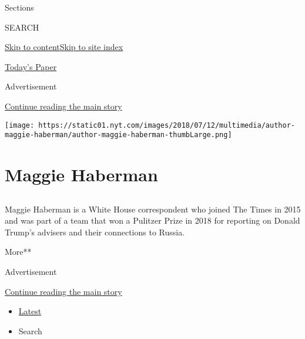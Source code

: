 Sections

SEARCH

\protect\hyperlink{site-content}{Skip to
content}\protect\hyperlink{site-index}{Skip to site index}

\href{https://myaccount.nytimes.com/auth/login?response_type=cookie\&client_id=vi}{}

\href{https://www.nytimes.com/section/todayspaper}{Today's Paper}

Advertisement

\protect\hyperlink{after-top}{Continue reading the main story}

\texttt{[image: https://static01.nyt.com/images/2018/07/12/multimedia/author-maggie-haberman/author-maggie-haberman-thumbLarge.png]}

\hypertarget{maggie-haberman}{%
\section{Maggie Haberman}\label{maggie-haberman}}

\subsection{}

Maggie Haberman is a White House correspondent who joined The Times in
2015 and was part of a team that won a Pulitzer Prize in 2018 for
reporting on Donald Trump's advisers and their connections to Russia.

More**

Advertisement

\protect\hyperlink{after-mid1}{Continue reading the main story}

\begin{itemize}
\tightlist
\item
  \protect\hyperlink{stream-panel}{Latest}
\item
  Search
\end{itemize}

